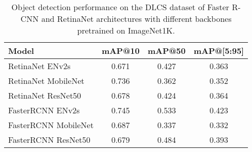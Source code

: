 \begin{table}[h]
    \centering
    \begin{tabular}{lccc}
        \hline
        \textbf{Model} & \textbf{mAP@10} & \textbf{mAP@50} & \textbf{mAP@[5:95]} \\
        \hline
        RetinaNet ENv2s      & 0.671 & 0.427 & 0.363 \\
        RetinaNet MobileNet  & 0.736 & 0.362 & 0.352 \\
        RetinaNet ResNet50   & 0.678 & 0.424 & 0.364 \\
        \rowcolor{yellow!20} 
        FasterRCNN ENv2s     & 0.745 & 0.533 & 0.423 \\
        FasterRCNN MobileNet & 0.687 & 0.337 & 0.332\\
        FasterRCNN ResNet50  & 0.679 & 0.484 & 0.393 \\
        \hline
    \end{tabular}
    \caption{Object detection performance on the DLCS dataset of Faster R-CNN and RetinaNet architectures with different backbones pretrained on ImageNet1K.}
    \label{tab:dlcs-models-not-pretrained}
\end{table}